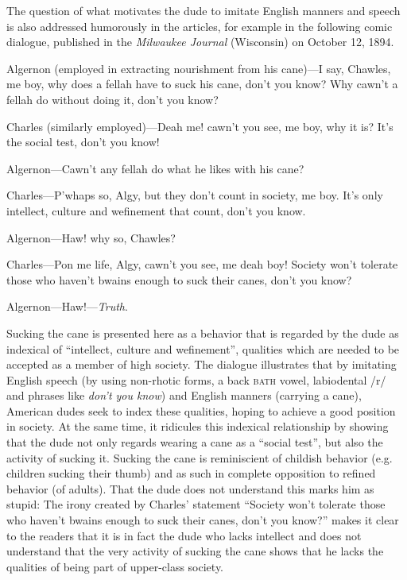 The question of what motivates the dude to imitate English manners and speech is also addressed humorously in the articles, for example in the following comic dialogue, published in the \textit{Milwaukee Journal} (Wisconsin) on October 12, 1894.

\begin{ipquote}
\begin{center}
\end{center}

Algernon (employed in extracting nourishment from his cane)—I say, Chawles, me boy, why do{\kern0pt}es a fellah have to suck his cane, don’t you know? Why cawn’t a fellah do without doing it, don’t you know?

Charles (similarly employed)—Deah me! cawn’t you see, me boy, why it is? It’s the social test, don’t you know!

Algernon—Cawn’t any fellah do what he likes with his cane?

Charles—P’whaps so, Algy, but they don’t count in society, me boy. It’s only intellect, culture and wefinement that count, don’t you know.

Algernon—Haw! why so, Chawles?

Charles—Pon me life, Algy, cawn’t you see, me deah boy! Society won’t tolerate those who haven’t bwains enough to suck their canes, don’t you know?

Algernon—Haw!—\textit{Truth}.
\end{ipquote}


Sucking the cane is presented here as a behavior that is regarded by the dude as indexical of “intellect, culture and wefinement”, qualities which are needed to be accepted as a member of high society. The dialogue illustrates that by imitating English speech (by using non-rhotic forms, a back \textsc{bath} vowel, labiodental /r/ and phrases like \emph{don’t you know}) and English manners (carrying a cane), American dudes seek to index these qualities, hoping to achieve a good position in society. At the same time, it ridicules this indexical relationship by showing that the dude not only regards wearing a cane as a “social test”, but also the activity of sucking it. Sucking the cane is reminiscient of childish behavior (e.g. children sucking their thumb) and as such in complete opposition to refined behavior (of adults). That the dude does not understand this marks him as stupid: The irony created by Charles’ statement “Society won’t tolerate those who haven’t bwains enough to suck their canes, don’t you know?” makes it clear to the readers that it is in fact the dude who lacks intellect and does not understand that the very activity of sucking the cane shows that he lacks the qualities of being part of upper-class society.


